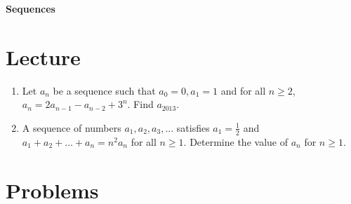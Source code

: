 \documentclass[11pt]{article}
\theoremstyle{theorem}
\theoremstyle{definition}
\theoremstyle{remark}
\theoremstyle{definition}
\theoremstyle{remark}
\begin{document}
\begin{center} 
        \Large \textbf{Sequences}
\end{center}
\section{Lecture}
\begin{enumerate}
\item Let $a_n$ be a sequence such that $a_0=0, a_1=1$ and for all $n \ge 2$, $a_n=2a_{n-1}-a_{n-2}+3^{n}$. Find $a_{2013}$.
\item A sequence of numbers $a_1,a_2,a_3,...$ satisfies $a_1=\frac{1}{2}$ and $a_1+a_2+...+a_n=n^2a_n$ for all $n\ge 1$. Determine the value of $a_n$ for $n\ge 1$.
\end{enumerate}
\section{Problems}
\end{document}
